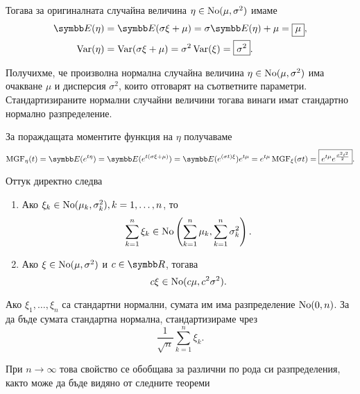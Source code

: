 \documentclass[
  headings=standardclasses,
  bibliography=totocnumbered,
]{scrartcl}
\begin{document}
Тогава за оригиналната случайна величина \( \eta \in \operatorname{No}(\mu, \sigma^2) \) имаме
\begin{align*}
  \Expect(\eta) &= \Expect(\sigma \xi + \mu) = \sigma \Expect(\eta) + \mu = \boxed{\mu}, \\
  \Var(\eta) &= \Var(\sigma \xi + \mu) = \sigma^2 \Var(\xi) = \boxed{\sigma^2}.
\end{align*}

Получихме, че произволна нормална случайна величина \( \eta \in \operatorname{No}(\mu, \sigma^2) \) има очакване \( \mu \) и дисперсия \( \sigma^2 \), които отговарят на съответните параметри. Стандартизираните нормални случайни величини тогава винаги имат стандартно нормално разпределение.

За пораждащата моментите функция на \( \eta \) получаваме
\begin{equation*}
  \MGF_\eta(t)
  =
  \Expect(e^{t\eta})
  =
  \Expect(e^{t(\sigma\xi + \mu)})
  =
  \Expect(e^{(\sigma t) \xi}) e^{t\mu}
  =
  e^{t\mu} \MGF_\xi(\sigma t)
  =
  \boxed{e^{t\mu} e^{\frac {\sigma^2 t^2} 2}}.
\end{equation*}

Оттук директно следва
\begin{proposition}\label{thm:normal_distribution_is_stable}
  \mbox{}
  \begin{enumerate}
    \item Ако \( \xi_k \in \operatorname{No}(\mu_k, \sigma_k^2), k = 1, \ldots, n \), то
    \begin{equation*}
      \sum_{k=1}^n \xi_k \in \operatorname{No}\left( \sum_{k=1}^n \mu_k, \sum_{k=1}^n \sigma_k^2 \right).
    \end{equation*}

    \item Ако \( \xi \in \operatorname{No}(\mu, \sigma^2) \) и \( c \in \R \), тогава
    \begin{equation*}
      c \xi \in \operatorname{No}(c \mu, c^2 \sigma^2).
    \end{equation*}
  \end{enumerate}
\end{proposition}

Ако \( \xi_1, \ldots, \xi_n \) са стандартни нормални, сумата им има разпределение \( \operatorname{No}(0, n) \). За да бъде сумата стандартна нормална, стандартизираме чрез
\begin{equation*}
  \frac 1 {\sqrt n} \sum_{k=1}^n \xi_k.
\end{equation*}

При \( n \to \infty \) това свойство се обобщава за различни по рода си разпределения, както може да бъде видяно от следните теореми
\end{document}
